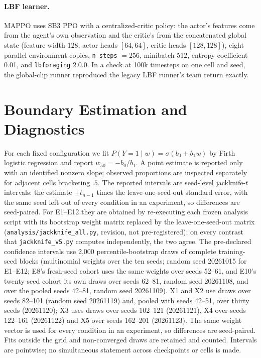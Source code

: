 \paragraph{LBF learner.}
MAPPO uses SB3 PPO with a centralized-critic policy: the actor's features come from the agent's own
observation and the critic's from the concatenated global state (feature width 128; actor heads
$[64,64]$, critic heads $[128,128]$), eight parallel environment copies, \texttt{n\_steps} $=256$,
minibatch 512, entropy coefficient 0.01, and \texttt{lbforaging} 2.0.0. In a check at 100k timesteps
on one cell and seed, the global-clip runner reproduced the legacy LBF runner's team return exactly.

\section{Boundary Estimation and Diagnostics}
\label{app:estimation}

For each fixed configuration we fit $P(Y=1\mid w)=\sigma(b_0+b_1w)$ by Firth logistic regression and
report $w_{50}=-b_0/b_1$. A point estimate is reported only with an identified nonzero slope; observed
proportions are inspected separately for adjacent cells bracketing $.5$. The reported intervals are seed-level
jackknife-$t$ intervals: the estimate $\pm t_{n-1}$ times the leave-one-seed-out standard error, with the same seed left out
of every condition in an experiment, so differences are seed-paired. For E1--E12 they are obtained by re-executing each
frozen analysis script with its bootstrap weight matrix replaced by the leave-one-seed-out matrix
(\texttt{analysis/jackknife\_all.py}, revision, not pre-registered); on every contrast that \texttt{jackknife\_v5.py}
computes independently, the two agree. The pre-declared confidence intervals use 2,000
percentile-bootstrap draws of complete training-seed blocks (multinomial weights over the ten seeds;
random seed 20261015 for E1--E12; E8's fresh-seed cohort uses the same weights over seeds 52--61, and E10's
twenty-seed cohort its own draws over seeds 62--81, random seed 20261108, and over the pooled seeds 42--81, random seed 20261109). X1 and X2 use draws over seeds 82--101 (random seed 20261119) and, pooled with seeds 42--51, over thirty seeds (20261120); X3 uses draws over seeds 102--121 (20261121), X4 over seeds 122--161 (20261122) and X5 over seeds 162--201 (20261123). The same weight vector is used for every condition in an experiment,
so differences are seed-paired. Fits outside the grid and non-converged draws are retained and counted.
Intervals are pointwise; no simultaneous statement across checkpoints or cells is made.

